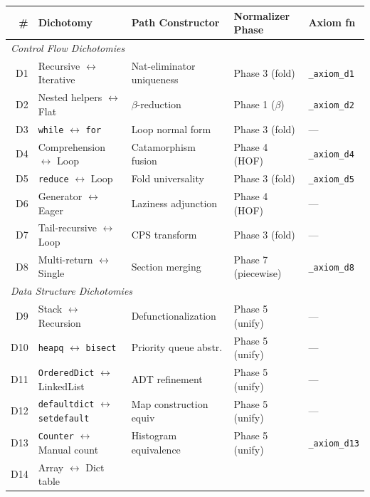 \begin{longtable}{r p{3.5cm} p{3.5cm} p{3.0cm} p{2.2cm}}
  \toprule
  \textbf{\#} & \textbf{Dichotomy} & \textbf{Path Constructor} &
  \textbf{Normalizer Phase} & \textbf{Axiom fn} \\
  \midrule
  \endhead
  \multicolumn{5}{l}{\emph{Control Flow Dichotomies}} \\
  \midrule
  D1 & Recursive $\leftrightarrow$ Iterative &
    Nat-eliminator uniqueness &
    Phase 3 (fold) &
    \texttt{\_axiom\_d1} \\
  D2 & Nested helpers $\leftrightarrow$ Flat &
    $\beta$-reduction &
    Phase 1 ($\beta$) &
    \texttt{\_axiom\_d2} \\
  D3 & \texttt{while} $\leftrightarrow$ \texttt{for} &
    Loop normal form &
    Phase 3 (fold) &
    --- \\
  D4 & Comprehension $\leftrightarrow$ Loop &
    Catamorphism fusion &
    Phase 4 (HOF) &
    \texttt{\_axiom\_d4} \\
  D5 & \texttt{reduce} $\leftrightarrow$ Loop &
    Fold universality &
    Phase 3 (fold) &
    \texttt{\_axiom\_d5} \\
  D6 & Generator $\leftrightarrow$ Eager &
    Laziness adjunction &
    Phase 4 (HOF) &
    --- \\
  D7 & Tail-recursive $\leftrightarrow$ Loop &
    CPS transform &
    Phase 3 (fold) &
    --- \\
  D8 & Multi-return $\leftrightarrow$ Single &
    Section merging &
    Phase 7 (piecewise) &
    \texttt{\_axiom\_d8} \\
  \midrule
  \multicolumn{5}{l}{\emph{Data Structure Dichotomies}} \\
  \midrule
  D9 & Stack $\leftrightarrow$ Recursion &
    Defunctionalization &
    Phase 5 (unify) &
    --- \\
  D10 & \texttt{heapq} $\leftrightarrow$ \texttt{bisect} &
    Priority queue abstr. &
    Phase 5 (unify) &
    --- \\
  D11 & \texttt{OrderedDict} $\leftrightarrow$ LinkedList &
    ADT refinement &
    Phase 5 (unify) &
    --- \\
  D12 & \texttt{defaultdict} $\leftrightarrow$ \texttt{setdefault} &
    Map construction equiv &
    Phase 5 (unify) &
    --- \\
  D13 & \texttt{Counter} $\leftrightarrow$ Manual count &
    Histogram equivalence &
    Phase 5 (unify) &
    \texttt{\_axiom\_d13} \\
  D14 & Array $\leftrightarrow$ Dict table &

\end{longtable}
